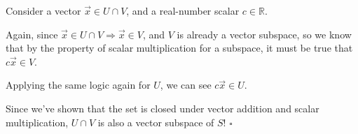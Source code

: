 {\begin{enumerate}
{        Consider a vector $\vec{x} \in U \cap V$, and a real-number scalar $c \in \mathbb{R}$.

        Again, since $\vec{x} \in U \cap V \Longrightarrow \vec{x} \in V$, and $V$ is already a vector subspace, so we know that by the property of scalar multiplication for a subspace, it must be true that $c\vec{x} \in V$.

        Applying the same logic again for $U$, we can see $c\vec{x} \in U$.
        }
    \end{enumerate}
    Since we've shown that the set is closed under vector addition and scalar multiplication, $U \cap V$ is also a vector subspace of $S$!  $\square$
}